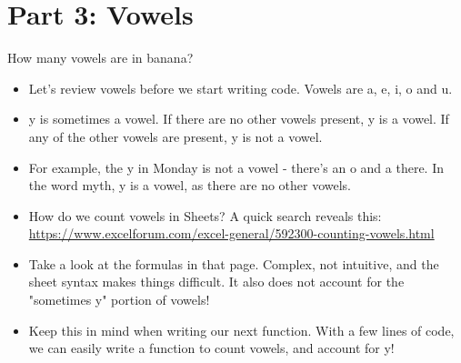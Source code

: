 \documentclass{article}
\begin{document}
\section*{Part 3: Vowels}
How many vowels are in banana?
\begin{itemize}
    \item Let's review vowels before we start writing code.  Vowels are a, e, i, o and u.
    \item y is sometimes a vowel.  If there are no other vowels present, y is a vowel.  If any of the other vowels are present, y is not a vowel.
    \item For example, the y in Monday is not a vowel - there's an o and a there.  In the word myth, y is a vowel, as there are no other vowels.
    \item How do we count vowels in Sheets?  A quick search reveals this:  \url{https://www.excelforum.com/excel-general/592300-counting-vowels.html}
    \item Take a look at the formulas in that page.  Complex, not intuitive, and the sheet syntax makes things difficult.  It also does not account for the "sometimes y" portion of vowels!
    \item Keep this in mind when writing our next function.  With a few lines of code, we can easily write a function to count vowels, and account for y!
\end{itemize}
\end{document}
